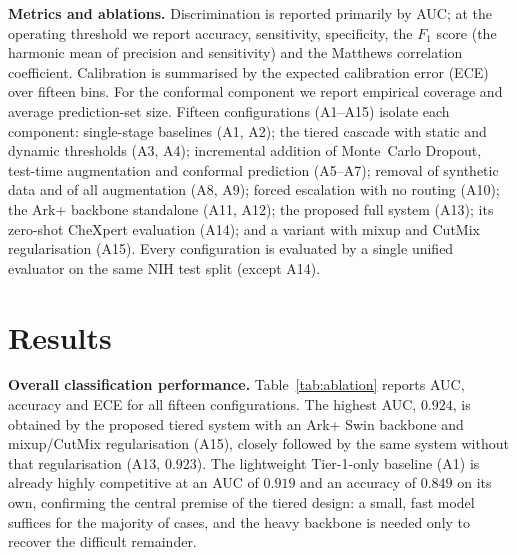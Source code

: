 \documentclass[pdflatex,sn-nature]{sn-jnl}
\begin{document}
\textbf{Metrics and ablations.} Discrimination is reported primarily by AUC; at the operating threshold we report accuracy, sensitivity, specificity, the $F_1$ score (the harmonic mean of precision and sensitivity) and the Matthews correlation coefficient. Calibration is summarised by the expected calibration error (ECE) over fifteen bins. For the conformal component we report empirical coverage and average prediction-set size. Fifteen configurations (A1--A15) isolate each component: single-stage baselines (A1, A2); the tiered cascade with static and dynamic thresholds (A3, A4); incremental addition of Monte~Carlo Dropout, test-time augmentation and conformal prediction (A5--A7); removal of synthetic data and of all augmentation (A8, A9); forced escalation with no routing (A10); the Ark+ backbone standalone (A11, A12); the proposed full system (A13); its zero-shot CheXpert evaluation (A14); and a variant with mixup and CutMix regularisation (A15). Every configuration is evaluated by a single unified evaluator on the same NIH test split (except A14).

\section{Results}\label{sec:results}

\textbf{Overall classification performance.} Table~\ref{tab:ablation} reports AUC, accuracy and ECE for all fifteen configurations. The highest AUC, $0.924$, is obtained by the proposed tiered system with an Ark+ Swin backbone and mixup/CutMix regularisation (A15), closely followed by the same system without that regularisation (A13, $0.923$). The lightweight Tier-1-only baseline (A1) is already highly competitive at an AUC of $0.919$ and an accuracy of $0.849$ on its own, confirming the central premise of the tiered design: a small, fast model suffices for the majority of cases, and the heavy backbone is needed only to recover the difficult remainder.
\end{document}
